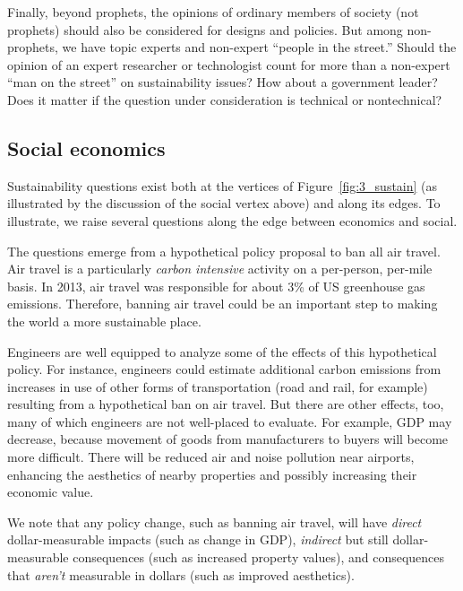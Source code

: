 \documentclass[12pt]{article}
\begin{document}
Finally, beyond prophets, the opinions of ordinary members of society (not prophets) 
should also be considered for designs and policies. 
But among non-prophets, we have topic experts and non-expert ``people in the street.''
Should the opinion of an expert researcher or technologist count for more 
than a non-expert ``man on the street'' on sustainability issues?
How about a government leader? 
Does it matter if the question under consideration is technical or nontechnical?


\subsection{Social economics}
\label{sec:social_economics}

Sustainability questions exist both at the vertices of Figure~\ref{fig:3_sustain}
(as illustrated by the discussion of the social vertex above) 
and along its edges.
To illustrate, we raise several questions along the edge between economics and social.

The questions emerge from a hypothetical policy proposal to ban all air travel.
Air travel is a particularly \emph{carbon intensive} activity on a per-person, per-mile basis. 
In 2013, air travel was responsible for about 3\% of US greenhouse gas emissions. 
Therefore, banning air travel could be an important step to making the world a more sustainable place. 

Engineers are well equipped to analyze some of the effects of this hypothetical policy. 
For instance, engineers could estimate additional carbon emissions 
from increases in use of other forms of transportation 
(road and rail, for example)
resulting from 
a hypothetical ban on air travel. 
But there are other effects, too, many of which engineers are not well-placed to evaluate.
For example, 
GDP may decrease, because movement of goods from 
manufacturers to buyers will become more difficult.
There will be reduced air and noise pollution near airports, 
enhancing the aesthetics of nearby properties
and possibly increasing their economic value. 

We note that any policy change, such as banning air travel, 
will have \emph{direct} dollar-measurable impacts (such as change in GDP), 
\emph{indirect} but still dollar-measurable consequences (such as increased property values), and
consequences that \emph{aren't} measurable in dollars 
(such as improved aesthetics). 
\end{document}
